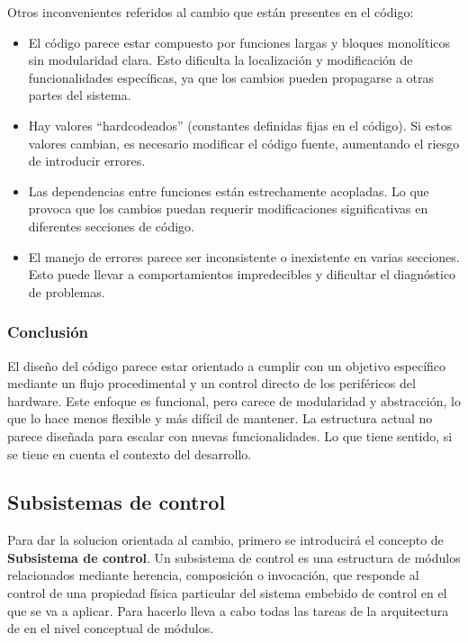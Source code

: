 Otros inconvenientes referidos al cambio que están presentes en el código:
\begin{itemize}
\item El código parece estar compuesto por funciones largas y bloques monolíticos sin modularidad clara. Esto dificulta la localización y modificación de funcionalidades específicas, ya que los cambios pueden propagarse a otras partes del sistema.
\item Hay valores ``hardcodeados'' (constantes definidas fijas en el código). Si estos valores cambian, es necesario modificar el código fuente, aumentando el riesgo de introducir errores.
\item Las dependencias entre funciones están estrechamente acopladas. Lo que provoca que los cambios puedan requerir modificaciones significativas en diferentes secciones de código.
\item El manejo de errores parece ser inconsistente o inexistente en varias secciones. Esto puede llevar a comportamientos impredecibles y dificultar el diagnóstico de problemas.
\end{itemize}

\subsubsection*{Conclusión}

El diseño del código parece estar orientado a cumplir con un objetivo específico mediante un flujo procedimental y un control directo de los periféricos del hardware. Este enfoque es funcional, pero carece de modularidad y abstracción, lo que lo hace menos flexible y más difícil de mantener. La estructura actual no parece diseñada para escalar con nuevas funcionalidades. Lo que tiene sentido, si se tiene en cuenta el contexto del desarrollo.


\subsection{Subsistemas de control}

Para dar la solucion orientada al cambio, primero se introducirá el concepto de \textbf{Subsistema de control}. Un subsistema de control es una estructura de módulos relacionados mediante herencia, composición o invocación, que responde al control de una propiedad física particular del sistema embebido de control en el que se va a aplicar. Para hacerlo lleva a cabo todas las tareas de la arquitectura de  en el nivel conceptual de módulos. 


